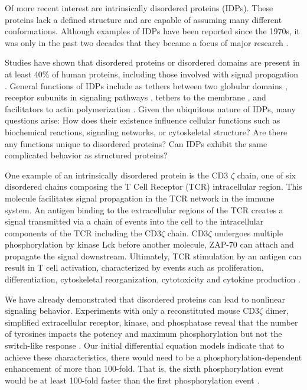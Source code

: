 \documentclass[../AdvancementSummary.tex]{subfiles}
\begin{document}
Of more recent interest are intrinsically disordered proteins (IDPs). These proteins lack a defined structure and are capable of assuming many different conformations. Although examples of IDPs have been reported since the 1970s, it was only in the past two decades that they became a focus of major research \cite{Dunker2008}. 


Studies have shown that disordered proteins or disordered domains are present in at least 40\% of human proteins, including those involved with signal propagation \cite{Tompa2012}. General functions of IDPs include as tethers between two globular domains \cite{Gonfloni1997}, receptor subunits in signaling pathways \cite{Duchardt2007}, tethers to the membrane \cite{Keir2008}, and facilitators to actin polymerization \cite{Kovar2004, Romero2004}. Given the ubiquitous nature of IDPs, many questions arise: How does their existence influence cellular functions such as biochemical reactions, signaling networks, or cytoskeletal structure?  Are there any functions unique to disordered proteins? Can IDPs exhibit the same complicated behavior as structured proteins?

One example of an intrinsically disordered protein is the CD3 $\zeta$ chain, one of six disordered chains composing the T Cell Receptor (TCR) intracellular region. This molecule facilitates signal propagation in the TCR network in the immune system. An antigen binding to the extracellular regions of the TCR creates a signal transmitted via a chain of events into the cell to the intracellular components of the TCR including the CD3$\zeta$ chain. CD3$\zeta$ undergoes multiple phosphorylation by kinase Lck before another molecule, ZAP-70 can attach and propagate the signal downstream. Ultimately, TCR stimulation by an antigen can result in T cell activation, characterized by events such as proliferation, differentiation, cytoskeletal reorganization, cytotoxicity and cytokine production \cite{Smith-Garvin2009, Lever2016}.


We have already demonstrated that disordered proteins can lead to nonlinear signaling behavior. Experiments with only a reconstituted mouse CD3$\zeta$ dimer, simplified extracellular receptor, kinase, and phosphatase reveal that the number of tyrosines impacts the potency and maximum phosphorylation but not the switch-like response \cite{Mukhopadhyay2016}. Our initial differential equation models indicate that to achieve these characteristics, there would need to be a phosphorylation-dependent enhancement of more than 100-fold. That is, the sixth phosphorylation event would be at least 100-fold faster than the first phosphorylation event \cite{Mukhopadhyay2016}. 
\end{document}
